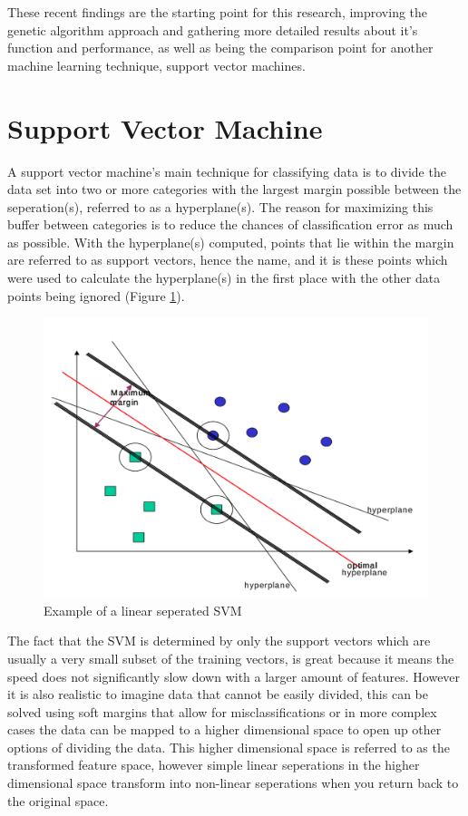 These recent findings are the starting point for this research, improving the genetic algorithm approach and gathering more detailed results about it's function and performance, as well as being the comparison point for another machine learning technique, support vector machines.

\section{Support Vector Machine} \label{sec:SVM}

A support vector machine's main technique for classifying data is to divide the data set into two or more categories with the largest margin possible between the seperation(s), referred to as a hyperplane(s).  The reason for maximizing this buffer between categories is to reduce the chances of classification error as much as possible.  With the hyperplane(s) computed, points that lie within the margin are referred to as support vectors, hence the name, and it is these points which were used to calculate the hyperplane(s) in the first place with the other data points being ignored (Figure \ref{fig:svmmargin}).  

\begin{figure}
	\includegraphics[width=450px]{./assets/img/svmmargin.png}
	\caption{Example of a linear seperated SVM \cite{supervisedMachineLearning}}
	\label{fig:svmmargin}
\end{figure}

The fact that the SVM is determined by only the support vectors which are usually a very small subset of the training vectors, is great because it means the speed does not significantly slow down with a larger amount of features.  However it is also realistic to imagine data that cannot be easily divided, this can be solved using soft margins that allow for misclassifications or in more complex cases the data can be mapped to a higher dimensional space to open up other options of dividing the data.  This higher dimensional space is referred to as the transformed feature space, however simple linear seperations in the higher dimensional space transform into non-linear seperations when you return back to the original space.  

